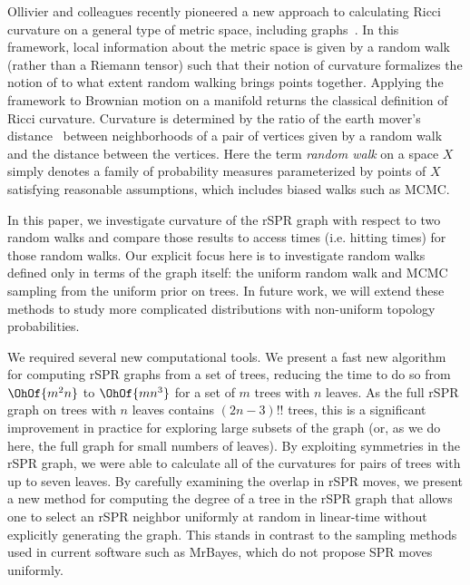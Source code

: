\documentclass[11pt]{amsart}
\begin{document}
Ollivier and colleagues recently pioneered a new approach to calculating Ricci curvature on a general type of metric space, including graphs~\cite{Ollivier2009-bw,Joulin2010-jg}.
In this framework, local information about the metric space is given by a random walk (rather than a Riemann tensor) such that their notion of curvature formalizes the notion of to what extent random walking brings points together.
Applying the framework to Brownian motion on a manifold returns the classical definition of Ricci curvature.
Curvature is determined by the ratio of the earth mover's distance~\cite{rubner2000earth} between neighborhoods of a pair of vertices given by a random walk and the distance between the vertices.
Here the term \emph{random walk} on a space $X$ simply denotes a family of probability measures parameterized by points of $X$ satisfying reasonable assumptions, which includes biased walks such as MCMC.

In this paper, we investigate curvature of the rSPR graph with respect to two random walks and compare those results to access times (i.e. hitting times) for those random walks.
Our explicit focus here is to investigate random walks defined only in terms of the graph itself: the uniform random walk and MCMC sampling from the uniform prior on trees.
In future work, we will extend these methods to study more complicated distributions with non-uniform topology probabilities.

We required several new computational tools.
We present a fast new algorithm for computing rSPR graphs from a set of trees, reducing the time to do so from $\OhOf{m^2n}$ to $\OhOf{mn^3}$ for a set of $m$ trees with $n$ leaves.
As the full rSPR graph on trees with $n$ leaves contains $(2n-3)!!$ trees, this is a significant improvement in practice for exploring large subsets of the graph (or, as we do here, the full graph for small numbers of leaves).
By exploiting symmetries in the rSPR graph, we were able to calculate all of the curvatures for pairs of trees with up to seven leaves.
By carefully examining the overlap in rSPR moves, we present a new method for computing the degree of a tree in the rSPR graph that allows one to select an rSPR neighbor uniformly at random in linear-time without explicitly generating the graph.
This stands in contrast to the sampling methods used in current software such as MrBayes, which do not propose SPR moves uniformly.
\end{document}
